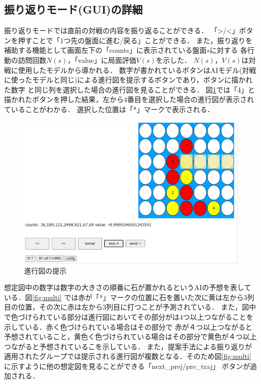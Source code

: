 \subsection{振り返りモード(GUI)の詳細}
振り返りモードでは直前の対戦の内容を振り返ることができる．
「>/<」ボタンを押すことで「1つ先の盤面に進む/戻る」ことができる．
また，振り返りを補助する機能として画面左下の「counts」に表示されている盤面$s$に対する
各行動の訪問回数$N(s)$，「value」に局面評価$V(s)$を示した．
$N(s)，V(s)$は対戦に使用したモデルから導かれる．
数字が書かれているボタンはAIモデル(対戦に使ったモデルと同じ)による進行図を提示するボタンであり，ボタンに描かれた数字
と同じ列を選択した場合の進行図を見ることができる．
図\ref{fig:number-button}では「4」と描かれたボタンを押した結果，左から4番目を選択した場合の進行図が表示されていることがわかる．
選択した位置は「*」マークで表示される．
\begin{figure}[t]
	\centering
    \includegraphics[width=\linewidth]{./figure/trajSystem.pdf}
	\caption{進行図の提示}
	\label{fig:number-button}
\end{figure}
想定図中の数字は数字の大きさの順番に石が置かれるというAIの予想を表している．図\ref{fig:multi}
では赤が「*」マークの位置に石を置いた次に黄は左から3列目の位置，その次に赤は左から3列目に打つことが予測されている．
また，図中で色づけられている部分は進行図においてその部分がは4つ以上つながることを示している．赤く色づけられている場合はその部分で
赤が４つ以上つながると予想されていること，黄色く色づけられている場合はその部分で黄色が４つ以上つながると予想されているこを示している．
また，提案手法による振り返りが適用されたグループでは提示される進行図が複数となる．そのため図\ref{fig:multi}に示すように他の想定図を見ることができる「next\_prej/pre\_traj」
ボタンが追加される．
